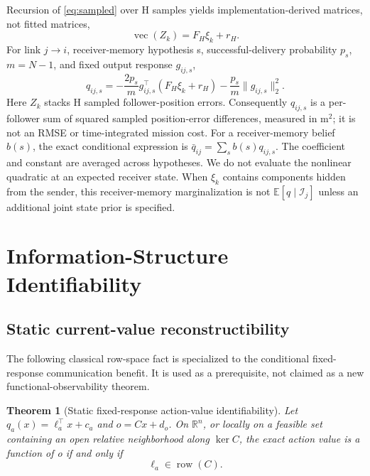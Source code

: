 \documentclass[10pt,twocolumn,twoside]{IEEEtran}
\newtheorem{theorem}{Theorem}
\DeclareMathOperator{\row}{row}
\begin{document}
Recursion of \eqref{eq:sampled} over H samples yields implementation-derived
matrices, not fitted matrices,
\begin{equation}
\operatorname{vec}(Z_k)=F_H\xi_k+r_H.
\label{eq:FH}
\end{equation}
For link \(j\to i\), receiver-memory hypothesis s, successful-delivery
probability \(p_s\), \(m=N-1\), and fixed output response \(g_{ij,s}\),
\begin{equation}
q_{ij,s}=-\frac{2p_s}{m}g_{ij,s}^\top(F_H\xi_k+r_H)
-\frac{p_s}{m}\|g_{ij,s}\|_2^2.
\label{eq:formation-value}
\end{equation}
Here \(Z_k\) stacks H sampled follower-position errors.  Consequently
\(q_{ij,s}\) is a per-follower sum of squared sampled position-error
differences, measured in \(\mathrm{m}^2\); it is not an RMSE or
time-integrated mission cost.
For a receiver-memory belief \(b(s)\), the exact conditional expression is
\(\bar q_{ij}=\sum_s b(s)q_{ij,s}\).  The coefficient and constant are
averaged across hypotheses.  We do not evaluate the nonlinear quadratic at
an expected receiver state.  When \(\xi_k\) contains components hidden from
the sender, this receiver-memory marginalization is not
\(\mathbb E[q\mid\mathcal I_j]\) unless an additional joint state prior is
specified.

\section{Information-Structure Identifiability}

\subsection{Static current-value reconstructibility}

The following classical row-space fact is specialized to the conditional
fixed-response communication benefit.  It is used as a prerequisite, not
claimed as a new functional-observability theorem.

\begin{theorem}[Static fixed-response action-value identifiability]
\label{thm:exact}
Let \(q_a(x)=\ell_a^\top x+c_a\) and \(o=Cx+d_o\).  On
\(\mathbb R^n\), or locally on a feasible set containing an open relative
neighborhood along \(\ker C\), the exact action value is a function of o if
and only if
\begin{equation}
\ell_a\in\row(C).
\label{eq:row-test}
\end{equation}
\end{theorem}
\end{document}
